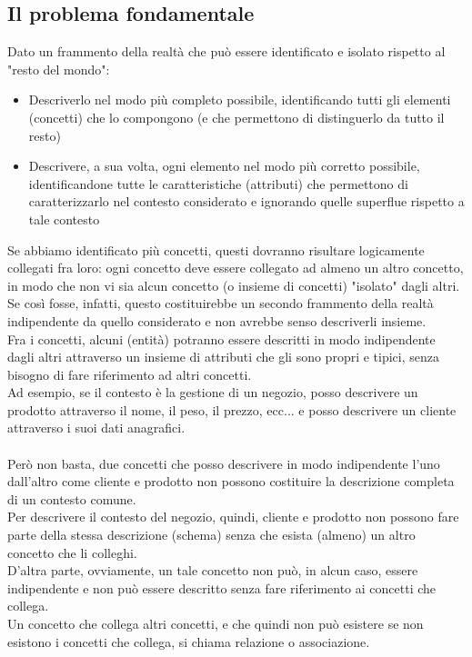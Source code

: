 \documentclass[../main.tex]{subfiles}
\begin{document}
	\subsection{Il problema fondamentale}
	Dato un frammento della realtà che può essere identificato e isolato rispetto al "resto del mondo":
	\begin{itemize}
		\item Descriverlo nel modo più completo possibile, identificando tutti gli elementi (concetti) che lo compongono (e che permettono di distinguerlo da tutto il resto)
		\item Descrivere, a sua volta, ogni elemento nel modo più corretto possibile, identificandone tutte le caratteristiche (attributi) che permettono di caratterizzarlo nel contesto considerato e ignorando quelle superflue rispetto a tale contesto
	\end{itemize}
	Se abbiamo identificato più concetti, questi dovranno risultare logicamente collegati fra loro: ogni concetto deve essere collegato ad almeno un altro concetto, in modo che non vi sia alcun concetto (o insieme di concetti) "isolato" dagli altri.\\
	Se così fosse, infatti, questo costituirebbe un secondo frammento della realtà indipendente da quello considerato e non avrebbe senso descriverli insieme.\\
	Fra i concetti, alcuni (entità) potranno essere descritti in modo indipendente dagli altri attraverso un insieme di attributi che gli sono propri e tipici, senza bisogno di fare riferimento ad altri concetti.\\
	Ad esempio, se il contesto è la gestione di un negozio, posso descrivere un prodotto attraverso il nome, il peso, il prezzo, ecc... e posso descrivere un cliente attraverso i suoi dati anagrafici.\\ \\
	Però non basta, due concetti che posso descrivere in modo indipendente l’uno dall’altro come cliente e prodotto non possono costituire la descrizione completa di un contesto comune.\\
	Per descrivere il contesto del negozio, quindi, cliente e prodotto non possono fare parte della stessa descrizione (schema) senza che esista (almeno) un altro concetto che li colleghi.\\
	D’altra parte, ovviamente, un tale concetto non può, in alcun caso, essere indipendente e non può essere descritto senza fare riferimento ai concetti che collega.\\
	Un concetto che collega altri concetti, e che quindi non può esistere se non esistono i concetti che collega, si chiama relazione o associazione.\\ \\
\end{document}
